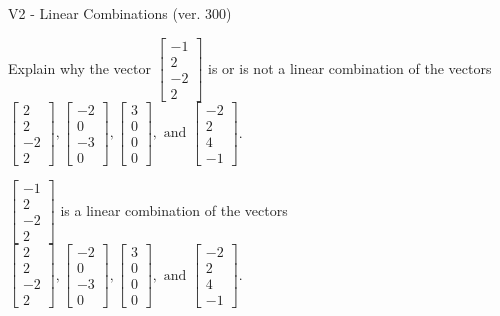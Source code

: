 \begin{exercise}
  \begin{exerciseTitle}V2 - Linear Combinations (ver. 300)\end{exerciseTitle}
  \begin{exerciseStatement}
    Explain why the vector \(\left[\begin{array}{c}
-1 \\
2 \\
-2 \\
2
\end{array}\right]\)  is or is not a linear 
	combination of the vectors \(\left[\begin{array}{c}
2 \\
2 \\
-2 \\
2
\end{array}\right] , \left[\begin{array}{c}
-2 \\
0 \\
-3 \\
0
\end{array}\right] , \left[\begin{array}{c}
3 \\
0 \\
0 \\
0
\end{array}\right] , \text{ and } \left[\begin{array}{c}
-2 \\
2 \\
4 \\
-1
\end{array}\right]\).
	


  \end{exerciseStatement}
  \begin{exerciseAnswer}
   \(\left[\begin{array}{c}
-1 \\
2 \\
-2 \\
2
\end{array}\right]\) 
  	 is  
	a linear combination of the vectors \(\left[\begin{array}{c}
2 \\
2 \\
-2 \\
2
\end{array}\right] , \left[\begin{array}{c}
-2 \\
0 \\
-3 \\
0
\end{array}\right] , \left[\begin{array}{c}
3 \\
0 \\
0 \\
0
\end{array}\right] , \text{ and } \left[\begin{array}{c}
-2 \\
2 \\
4 \\
-1
\end{array}\right]\).


\end{exerciseAnswer}
\end{exercise}
